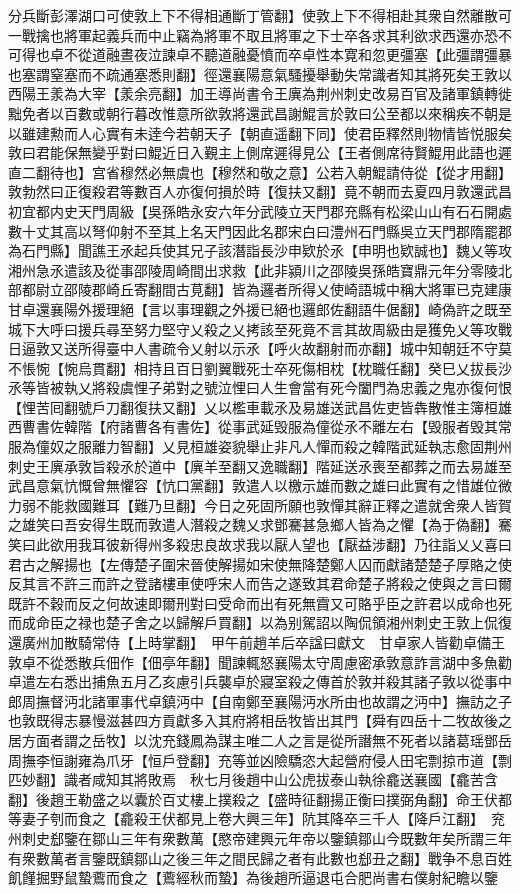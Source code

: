 分兵斷彭澤湖口可使敦上下不得相通斷丁管翻】使敦上下不得相赴其衆自然離散可一戰擒也將軍起義兵而中止竊為將軍不取且將軍之下士卒各求其利欲求西還亦恐不可得也卓不從道融晝夜泣諫卓不聽道融憂憤而卒卓性本寛和忽更彊塞【此彊謂彊暴也塞謂窒塞而不疏通塞悉則翻】徑還襄陽意氣騷擾舉動失常識者知其將死矣王敦以西陽王羕為大宰【羕余亮翻】加王導尚書令王廙為荆州刺史改易百官及諸軍鎮轉徙黜免者以百數或朝行暮改惟意所欲敦將還武昌謝鯤言於敦曰公至都以來稱疾不朝是以雖建勲而人心實有未逹今若朝天子【朝直遥翻下同】使君臣釋然則物情皆悦服矣敦曰君能保無變乎對曰鯤近日入覲主上側席遲得見公【王者側席待賢鯤用此語也遲直二翻待也】宫省穆然必無虞也【穆然和敬之意】公若入朝鯤請侍從【從才用翻】敦勃然曰正復殺君等數百人亦復何損於時【復扶又翻】竟不朝而去夏四月敦還武昌初宜都内史天門周級【吳孫皓永安六年分武陵立天門郡充縣有松梁山山有石石開處數十丈其高以弩仰射不至其上名天門因此名郡宋白曰澧州石門縣吳立天門郡隋罷郡為石門縣】聞譙王氶起兵使其兄子該潛詣長沙申欵於氶【申明也欵誠也】魏乂等攻湘州急氶遣該及從事邵陵周崎間出求救【此非潁川之邵陵吳孫皓寶鼎元年分零陵北部都尉立邵陵郡崎丘寄翻間古莧翻】皆為邏者所得乂使崎語城中稱大將軍已克建康甘卓還襄陽外援理絕【言以事理觀之外援已絕也邏郎佐翻語牛倨翻】崎偽許之既至城下大呼曰援兵尋至努力堅守乂殺之乂拷該至死竟不言其故周級由是獲免乂等攻戰日逼敦又送所得臺中人書疏令乂射以示氶【呼火故翻射而亦翻】城中知朝廷不守莫不悵惋【惋烏貫翻】相持且百日劉翼戰死士卒死傷相枕【枕職任翻】癸巳乂拔長沙氶等皆被執乂將殺虞悝子弟對之號泣悝曰人生會當有死今闔門為忠義之鬼亦復何恨【悝苦囘翻號戶刀翻復扶又翻】乂以檻車載氶及易雄送武昌佐吏皆犇散惟主簿桓雄西曹書佐韓階【府諸曹各有書佐】從事武延毁服為僮從氶不離左右【毁服者毁其常服為僮奴之服離力智翻】乂見桓雄姿貌舉止非凡人憚而殺之韓階武延執志愈固荆州刺史王廙承敦旨殺氶於道中【廙羊至翻又逸職翻】階延送氶喪至都葬之而去易雄至武昌意氣忼慨曾無懼容【忼口黨翻】敦遣人以檄示雄而數之雄曰此實有之惜雄位微力弱不能救國難耳【難乃旦翻】今日之死固所願也敦憚其辭正釋之遣就舍衆人皆賀之雄笑曰吾安得生既而敦遣人潛殺之魏乂求鄧騫甚急鄉人皆為之懼【為于偽翻】騫笑曰此欲用我耳彼新得州多殺忠良故求我以厭人望也【厭益涉翻】乃往詣乂乂喜曰君古之解揚也【左傳楚子圍宋晉使解揚如宋使無降楚鄭人囚而獻諸楚楚子厚賂之使反其言不許三而許之登諸樓車使呼宋人而告之遂致其君命楚子將殺之使與之言曰爾既許不穀而反之何故速即爾刑對曰受命而出有死無霣又可賂乎臣之許君以成命也死而成命臣之禄也楚子舍之以歸解戶買翻】以為别駕詔以陶侃領湘州刺史王敦上侃復還廣州加散騎常侍【上時掌翻】　甲午前趙羊后卒諡曰獻文　甘卓家人皆勸卓備王敦卓不從悉散兵佃作【佃亭年翻】聞諫輒怒襄陽太守周慮密承敦意詐言湖中多魚勸卓遣左右悉出捕魚五月乙亥慮引兵襲卓於寢室殺之傳首於敦并殺其諸子敦以從事中郎周撫督沔北諸軍事代卓鎮沔中【自南鄭至襄陽沔水所由也故謂之沔中】撫訪之子也敦既得志暴慢滋甚四方貢獻多入其府將相岳牧皆出其門【舜有四岳十二牧故後之居方面者謂之岳牧】以沈充錢鳳為謀主唯二人之言是從所譖無不死者以諸葛瑶鄧岳周撫李恒謝雍為爪牙【恒戶登翻】充等並凶險驕恣大起營府侵人田宅剽掠市道【剽匹妙翻】識者咸知其將敗焉　秋七月後趙中山公虎拔泰山執徐龕送襄國【龕苦含翻】後趙王勒盛之以囊於百丈樓上撲殺之【盛時征翻揚正衡曰撲弼角翻】命王伏都等妻子刳而食之【龕殺王伏都見上卷大興三年】阬其降卒三千人【降戶江翻】　兖州刺史郄鑒在鄒山三年有衆數萬【愍帝建興元年帝以鑒鎮鄒山今既數年矣所謂三年有衆數萬者言鑒既鎮鄒山之後三年之間民歸之者有此數也郄丑之翻】戰争不息百姓飢饉掘野鼠蟄鷰而食之【鷰經秋而蟄】為後趙所逼退屯合肥尚書右僕射紀瞻以鑒